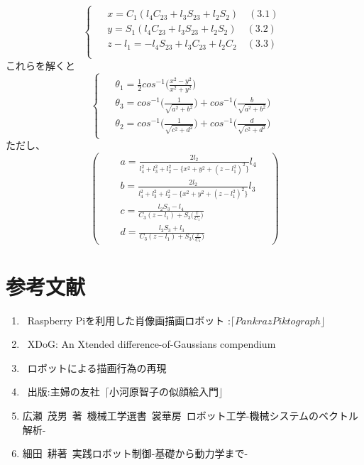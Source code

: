 \documentclass[a4j]{jarticle}			%
\begin{document}
\begin{multicols}{2}
\begin{equation*}
	\left\{
		\begin{array}{c}
		\begin{split}
			&x=C_1(l_4C_{23}+l_3S_{23}+l_2S_2)\quad(3.1) \\
			&y=S_1(l_4C_{23}+l_3S_{23}+l_2S_2)\quad(3.2) \\
			&z-l_1=-l_4S_{23}+l_3C_{23}+l_2C_2\quad(3.3) \\
		\end{split}
	\end{array}
	\right.
\end{equation*}
これらを解くと
\tiny
\begin{equation*}
\left\{
	\begin{array}{c}
	\begin{split}
		&\theta_1=\frac{1}{2}cos^{-1}\biggl( \frac{x^2-y^2}{x^2+y^2} \biggr) \\
		&\theta_3= cos^{-1}\biggl( \frac{1}{\sqrt{a^2+b^2}}\biggr) + cos^{-1}\biggl( \frac{b}{\sqrt{a^2+b^2}}\biggr)\\
		&\theta_2= cos^{-1}\biggl( \frac{1}{\sqrt{c^2+d^2}}\biggr) + cos^{-1}\biggl( \frac{d}{\sqrt{c^2+d^2}}\biggr)
	\end{split}
	\end{array}
\right.
\end{equation*}
\small
ただし、
\begin{equation*}
	\left(\quad
	\begin{split}
		&a=\frac{2l_2}{l_4^2+l_3^2+l_2^2-\{x^2+y^2+(z-l_1^2)^2 \} }l_4\\
		&b=\frac{2l_2}{l_4^2+l_3^2+l_2^2-\{x^2+y^2+(z-l_1^2)^2 \} }l_3\\
		&c=\frac{l_2S_3-l_4}{ C_3(z-l_1)+S_3\bigl(\frac{x}{C_1}\bigr)}\\
		&d=\frac{l_2S_3+l_3}{ C_3(z-l_1)+S_3\bigl(\frac{x}{C_1}\bigr)}
	\end{split}
	\quad\right)
\end{equation*}

\section{参考文献}

\begin{enumerate}
\item {}\rbrack \ Raspberry Piを利用した肖像画描画ロボット :$ \lceil Pankraz Piktograph \rfloor$ \\
\item {}\rbrack \ XDoG: An Xtended difference-of-Gaussians compendium \\
\item {}\rbrack \ ロボットによる描画行為の再現\\
\item {}\rbrack \ 出版:主婦の友社\ $\lceil \text{小河原智子の似顔絵入門} \rfloor$\\
\item 広瀬\ 茂男\ 著\ 機械工学選書\ 裳華房\ ロボット工学-機械システムのベクトル解析-\\
\item 細田\ 耕著\ 実践ロボット制御-基礎から動力学まで- \\
\end{enumerate}

\end{multicols}
\end{document}
